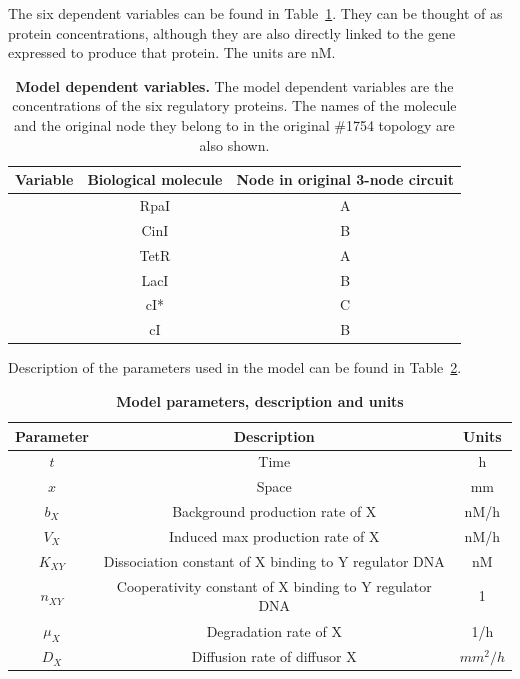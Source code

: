 The six dependent variables can be found in Table~\ref{tab:Model variables}.
They can be thought of as protein concentrations,
although they are also directly linked to the gene expressed to produce that protein.
The units are nM.
\begin{table}[H]
    \centering
    \caption{\textbf{Model dependent variables.} The model dependent variables are the concentrations of the six regulatory proteins.
    The names of the molecule and the original node they belong to in the original \#1754 topology are also shown.}
    \label{tab:Model variables}
    \renewcommand{\arraystretch}{1.3} %
    \begin{tabular}{|c|c|c|}
        \hline
        \textbf{Variable} & \textbf{Biological molecule} & \textbf{Node in original 3-node circuit}\\
        \hline
        [A] & RpaI & A\\
        \hline
        [B] & CinI & B \\
        \hline
        [C] & TetR & A\\
        \hline
        [D] & LacI & B \\
        \hline
        [E] & cI* & C \\
        \hline
        [F] & cI & B \\
        \hline
    \end{tabular}
\end{table}
Description of the parameters used in the model can be found in Table~\ref{tab:model params}.

\begin{table}[H]
    \centering
    \caption{\textbf{Model parameters, description and units}}
    \label{tab:model params}
    \renewcommand{\arraystretch}{1.3} %
    \begin{tabular}{|c|c|c|}
        \hline
        \textbf{Parameter} & \textbf{Description} & \textbf{Units}\\
        \hline
        $t$ & Time & h\\
        \hline
        $x$ & Space & mm\\
        \hline
        $b_{X}$ & Background production rate of X & nM/h\\
        \hline
        $V_{X}$ & Induced max production rate of X & nM/h \\
        \hline
        $K_{XY}$ & Dissociation constant of X binding to Y regulator DNA & nM \\
        \hline
        $n_{XY}$ & Cooperativity constant of X binding to Y regulator DNA & 1\\
        \hline
        $\mu_{X}$ & Degradation rate of X & 1/h\\
        \hline
        $D_{X}$ & Diffusion rate of diffusor X & $mm^2/h$\\
        \hline

    \end{tabular}
\end{table}


